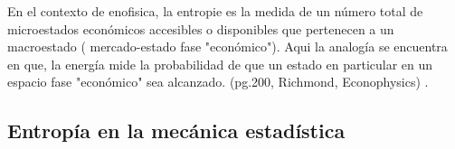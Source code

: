 En el contexto de enofisica, la entropie es la medida de un número total de microestados económicos accesibles o disponibles que pertenecen a un macroestado ( mercado-estado fase "económico"). Aqui la analogía se encuentra en que, la energía mide la probabilidad de que un estado en particular en un espacio fase "económico" sea alcanzado. (pg.200, Richmond, Econophysics) \citep{cottrell_classical_2009}.

\subsection{Entropía en la mecánica estadística} 




